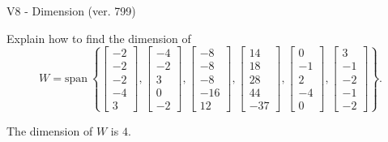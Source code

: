 \begin{exercise}
  \begin{exerciseTitle}V8 - Dimension (ver. 799)\end{exerciseTitle}
  \begin{exerciseStatement}
    Explain how to find the dimension of 
\[W=\mathrm{span}\ \left\{\left[\begin{array}{r}
-2 \\
-2 \\
-2 \\
-4 \\
3
\end{array}\right] , \left[\begin{array}{r}
-4 \\
-2 \\
3 \\
0 \\
-2
\end{array}\right] , \left[\begin{array}{r}
-8 \\
-8 \\
-8 \\
-16 \\
12
\end{array}\right] , \left[\begin{array}{r}
14 \\
18 \\
28 \\
44 \\
-37
\end{array}\right] , \left[\begin{array}{r}
0 \\
-1 \\
2 \\
-4 \\
0
\end{array}\right] , \left[\begin{array}{r}
3 \\
-1 \\
-2 \\
-1 \\
-2
\end{array}\right]\right\}.\]



  \end{exerciseStatement}
  \begin{exerciseAnswer}
   The dimension of \(W\) is  \(4\).
  


  \end{exerciseAnswer}
\end{exercise}